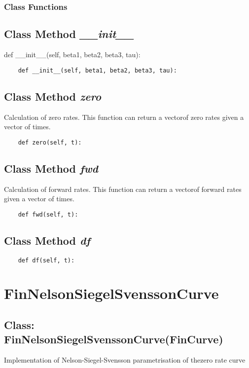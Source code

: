 \documentclass[twoside,11pt]{book}
\begin{document}
\subsubsection{Class Functions}

\subsection{Class Method {\it \_\_init\_\_}}
def \_\_init\_\_(self, beta1, beta2, beta3, tau):

\begin{lstlisting}
    def __init__(self, beta1, beta2, beta3, tau):
\end{lstlisting}

\subsection{Class Method {\it zero}}
Calculation of zero rates. This function can return a vectorof zero rates given a vector of times. 

\begin{lstlisting}
    def zero(self, t):
\end{lstlisting}

\subsection{Class Method {\it fwd}}
Calculation of forward rates. This function can return a vectorof forward rates given a vector of times. 

\begin{lstlisting}
    def fwd(self, t):
\end{lstlisting}

\subsection{Class Method {\it df}}


\begin{lstlisting}
    def df(self, t):
\end{lstlisting}

\newpage
\section{FinNelsonSiegelSvenssonCurve}

\subsection{Class: FinNelsonSiegelSvenssonCurve(FinCurve)}
Implementation of Nelson-Siegel-Svensson parametrisation of thezero rate curve 
\end{document}
